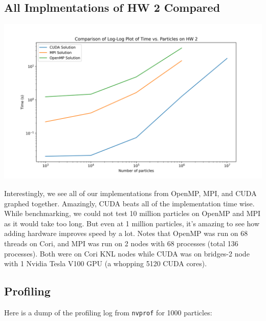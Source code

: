 \documentclass{article}
\begin{document}
\subsection{All Implmentations of HW 2 Compared}
\centerline{\includegraphics[width=6in]{figures/hw2-compare.png}}

Interestingly, we see all of our implementations from OpenMP, MPI, and CUDA graphed together. Amazingly, CUDA beats all of the implementation time wise. While benchmarking, we could not test 10 million particles on OpenMP and MPI as it would take too long. But even at 1 million particles, it's amazing to see how adding hardware improves speed by a lot. Notes that OpenMP was run on 68 threads on Cori, and MPI was run on 2 nodes with 68 processes (total 136 processes). Both were on Cori KNL nodes while CUDA was on bridges-2 node with 1 Nvidia Tesla V100 GPU (a whopping 5120 CUDA cores).

\subsection{Profiling}
Here is a dump of the profiling log from \verb|nvprof| for 1000 particles:
\end{document}
